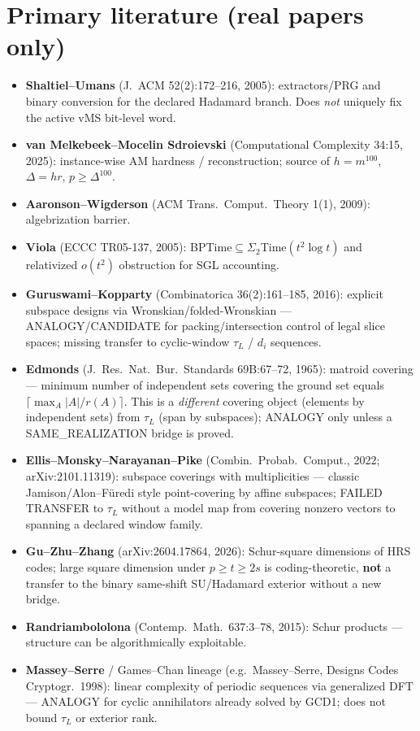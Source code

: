 \documentclass[11pt]{article}
\begin{document}
\section*{Primary literature (real papers only)}
\begin{itemize}
\item \textbf{Shaltiel--Umans} (J.~ACM 52(2):172--216, 2005): extractors/PRG and binary conversion
for the declared Hadamard branch. Does \emph{not} uniquely fix the active vMS bit-level word.
\item \textbf{van Melkebeek--Mocelin Sdroievski} (Computational Complexity 34:15, 2025): instance-wise
AM hardness / reconstruction; source of $h=m^{100}$, $\Delta=hr$, $p\ge\Delta^{100}$.
\item \textbf{Aaronson--Wigderson} (ACM Trans.\ Comput.\ Theory 1(1), 2009): algebrization barrier.
\item \textbf{Viola} (ECCC TR05-137, 2005): BPTime$\subseteq\Sigma_2$Time$(t^2\log t)$ and relativized
$o(t^2)$ obstruction for SGL accounting.
\item \textbf{Guruswami--Kopparty} (Combinatorica 36(2):161--185, 2016): explicit subspace designs via
Wronskian/folded-Wronskian --- ANALOGY/CANDIDATE for packing/intersection control of legal slice
spaces; missing transfer to cyclic-window $\tau_L$ / $d_i$ sequences.
\item \textbf{Edmonds} (J.\ Res.\ Nat.\ Bur.\ Standards 69B:67--72, 1965): matroid covering ---
minimum number of independent sets covering the ground set equals $\lceil\max_A |A|/r(A)\rceil$.
This is a \emph{different} covering object (elements by independent sets) from $\tau_L$ (span by
subspaces); ANALOGY only unless a SAME\_REALIZATION bridge is proved.
\item \textbf{Ellis--Monsky--Narayanan--Pike} (Combin.\ Probab.\ Comput., 2022;
arXiv:2101.11319): subspace coverings with multiplicities --- classic Jamison/Alon--F\"uredi style
point-covering by affine subspaces; FAILED TRANSFER to $\tau_L$ without a model map from covering
nonzero vectors to spanning a declared window family.
\item \textbf{Gu--Zhu--Zhang} (arXiv:2604.17864, 2026): Schur-square dimensions of HRS codes;
large square dimension under $p\ge t\ge 2s$ is coding-theoretic, \textbf{not} a transfer to the
binary same-shift SU/Hadamard exterior without a new bridge.
\item \textbf{Randriambololona} (Contemp.\ Math.\ 637:3--78, 2015): Schur products --- structure can be
algorithmically exploitable.
\item \textbf{Massey--Serre} / Games--Chan lineage (e.g.\ Massey--Serre, Designs Codes Cryptogr.\ 1998):
linear complexity of periodic sequences via generalized DFT --- ANALOGY for cyclic annihilators
already solved by GCD1; does not bound $\tau_L$ or exterior rank.
\end{itemize}
\end{document}
